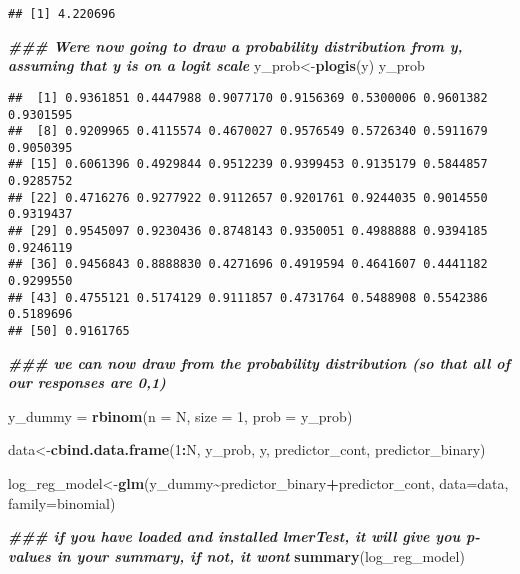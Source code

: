 \documentclass[
]{article}
\newenvironment{Shaded}{\begin{snugshade}}{\end{snugshade}}
\newcommand{\AttributeTok}[1]{\textcolor[rgb]{0.13,0.29,0.53}{#1}}
\newcommand{\DecValTok}[1]{\textcolor[rgb]{0.00,0.00,0.81}{#1}}
\newcommand{\DocumentationTok}[1]{\textcolor[rgb]{0.56,0.35,0.01}{\textbf{\textit{#1}}}}
\newcommand{\FunctionTok}[1]{\textcolor[rgb]{0.13,0.29,0.53}{\textbf{#1}}}
\newcommand{\NormalTok}[1]{#1}
\newcommand{\OtherTok}[1]{\textcolor[rgb]{0.56,0.35,0.01}{#1}}
\newcommand{\SpecialCharTok}[1]{\textcolor[rgb]{0.81,0.36,0.00}{\textbf{#1}}}
\newcommand{\StringTok}[1]{\textcolor[rgb]{0.31,0.60,0.02}{#1}}
\begin{document}
\begin{verbatim}
## [1] 4.220696
\end{verbatim}

\begin{Shaded}
\begin{Highlighting}[]
\DocumentationTok{\#\#\# We\textquotesingle{}re now going to draw a probability distribution from y, assuming that y is on a logit scale}
\NormalTok{y\_prob}\OtherTok{\textless{}{-}}\FunctionTok{plogis}\NormalTok{(y)}
\NormalTok{y\_prob}
\end{Highlighting}
\end{Shaded}

\begin{verbatim}
##  [1] 0.9361851 0.4447988 0.9077170 0.9156369 0.5300006 0.9601382 0.9301595
##  [8] 0.9209965 0.4115574 0.4670027 0.9576549 0.5726340 0.5911679 0.9050395
## [15] 0.6061396 0.4929844 0.9512239 0.9399453 0.9135179 0.5844857 0.9285752
## [22] 0.4716276 0.9277922 0.9112657 0.9201761 0.9244035 0.9014550 0.9319437
## [29] 0.9545097 0.9230436 0.8748143 0.9350051 0.4988888 0.9394185 0.9246119
## [36] 0.9456843 0.8888830 0.4271696 0.4919594 0.4641607 0.4441182 0.9299550
## [43] 0.4755121 0.5174129 0.9111857 0.4731764 0.5488908 0.5542386 0.5189696
## [50] 0.9161765
\end{verbatim}

\begin{Shaded}
\begin{Highlighting}[]
\DocumentationTok{\#\#\# we can now draw from the probability distribution (so that all of our responses are 0,1)}

\NormalTok{y\_dummy }\OtherTok{=} \FunctionTok{rbinom}\NormalTok{(}\AttributeTok{n =}\NormalTok{ N, }\AttributeTok{size =} \DecValTok{1}\NormalTok{, }\AttributeTok{prob =}\NormalTok{ y\_prob)}


\NormalTok{data}\OtherTok{\textless{}{-}}\FunctionTok{cbind.data.frame}\NormalTok{(}\DecValTok{1}\SpecialCharTok{:}\NormalTok{N, y\_prob, y, predictor\_cont, predictor\_binary)}

\NormalTok{log\_reg\_model}\OtherTok{\textless{}{-}}\FunctionTok{glm}\NormalTok{(y\_dummy}\SpecialCharTok{\textasciitilde{}}\NormalTok{predictor\_binary}\SpecialCharTok{+}\NormalTok{predictor\_cont, }\AttributeTok{data=}\NormalTok{data, }\AttributeTok{family=}\StringTok{\textquotesingle{}binomial\textquotesingle{}}\NormalTok{)}

\DocumentationTok{\#\#\# if you have loaded and installed lmerTest, it will give you p{-}values in your summary, if not, it won\textquotesingle{}t}
\FunctionTok{summary}\NormalTok{(log\_reg\_model)}
\end{Highlighting}
\end{Shaded}
\end{document}
